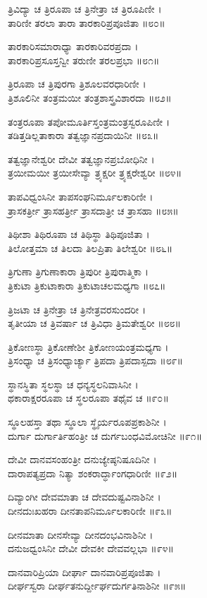 ತ್ರಿವಿದ್ಯಾ ಚ ತ್ರಿರೂಪಾ ಚ ತ್ರಿನೇತ್ರಾ ಚ ತ್ರಿರೂಪಿಣೀ ।\\
ತಾರಿಣೀ ತರಲಾ ತಾರಾ ತಾರಕಾರಿಪ್ರಪೂಜಿತಾ ॥೮೦॥

ತಾರಕಾರಿಸಮಾರಾಧ್ಯಾ ತಾರಕಾರಿವರಪ್ರದಾ ।\\
ತಾರಕಾರಿಪ್ರಸೂಸ್ತನ್ವೀ ತರುಣೀ ತರಲಪ್ರಭಾ ॥೮೧॥

ತ್ರಿರೂಪಾ ಚ ತ್ರಿಪುರಗಾ ತ್ರಿಶೂಲವರಧಾರಿಣೀ ।\\
ತ್ರಿಶೂಲಿನೀ ತಂತ್ರಮಯೀ ತಂತ್ರಶಾಸ್ತ್ರವಿಶಾರದಾ ॥೮೨॥

ತಂತ್ರರೂಪಾ ತಪೋಮೂರ್ತಿಸ್ತಂತ್ರಮಂತ್ರಸ್ವರೂಪಿಣೀ ।\\
ತಡಿತ್ತಡಿಲ್ಲತಾಕಾರಾ ತತ್ವಜ್ಞಾನಪ್ರದಾಯಿನೀ ॥೮೩॥

ತತ್ವಜ್ಞಾನೇಶ್ವರೀ ದೇವೀ ತತ್ವಜ್ಞಾನಪ್ರಬೋಧಿನೀ ।\\
ತ್ರಯೀಮಯೀ ತ್ರಯೀಸೇವ್ಯಾ ತ್ರ್ಯಕ್ಷರೀ ತ್ರ್ಯಕ್ಷರೇಶ್ವರೀ ॥೮೪॥

ತಾಪವಿಧ್ವಂಸಿನೀ ತಾಪಸಂಘನಿರ್ಮೂಲಕಾರಿಣೀ ।\\
ತ್ರಾಸಕರ್ತ್ರೀ ತ್ರಾಸಹರ್ತ್ರೀ ತ್ರಾಸದಾತ್ರೀ ಚ ತ್ರಾಸಹಾ ॥೮೫॥

ತಿಥೀಶಾ ತಿಥಿರೂಪಾ ಚ ತಿಥಿಸ್ಥಾ ತಿಥಿಪೂಜಿತಾ ।\\
ತಿಲೋತ್ತಮಾ ಚ ತಿಲದಾ ತಿಲಪ್ರಿತಾ ತಿಲೇಶ್ವರೀ ॥೮೬॥

ತ್ರಿಗುಣಾ ತ್ರಿಗುಣಾಕಾರಾ ತ್ರಿಪುರೀ ತ್ರಿಪುರಾತ್ಮಿಕಾ ।\\
ತ್ರಿಕುಟಾ ತ್ರಿಕುಟಾಕಾರಾ ತ್ರಿಕುಟಾಚಲಮಧ್ಯಗಾ ॥೮೭॥

ತ್ರಿಜಟಾ ಚ ತ್ರಿನೇತ್ರಾ ಚ ತ್ರಿನೇತ್ರವರಸುಂದರೀ ।\\
ತೃತೀಯಾ ಚ ತ್ರಿವರ್ಷಾ ಚ ತ್ರಿವಿಧಾ ತ್ರಿಮತೇಶ್ವರೀ ॥೮೮॥

ತ್ರಿಕೋಣಸ್ಥಾ ತ್ರಿಕೋಣೇಶೀ ತ್ರಿಕೋಣಯಂತ್ರಮಧ್ಯಗಾ ।\\
ತ್ರಿಸಂಧ್ಯಾ ಚ ತ್ರಿಸಂಧ್ಯಾರ್ಚ್ಯಾ ತ್ರಿಪದಾ ತ್ರಿಪದಾಸ್ಪದಾ ॥೮೯॥

ಸ್ಥಾನಸ್ಥಿತಾ ಸ್ಥಲಸ್ಥಾ ಚ ಧನ್ಯಸ್ಥಲನಿವಾಸಿನೀ ।\\
ಥಕಾರಾಕ್ಷರರೂಪಾ ಚ ಸ್ಥಲರೂಪಾ ತಥೈವ ಚ ॥೯೦॥

ಸ್ಥೂಲಹಸ್ತಾ ತಥಾ ಸ್ಥೂಲಾ ಸ್ಥೈರ್ಯರೂಪಪ್ರಕಾಶಿನೀ ।\\
ದುರ್ಗಾ ದುರ್ಗಾರ್ತಿಹಂತ್ರೀ ಚ ದುರ್ಗಬಂಧವಿಮೋಚಿನೀ ॥೯೧॥

ದೇವೀ ದಾನವಸಂಹಂತ್ರೀ ದನುಜ್ಯೇಷ್ಠನಿಷೂದಿನೀ ।\\
ದಾರಾಪತ್ಯಪ್ರದಾ ನಿತ್ಯಾ ಶಂಕರಾರ್ದ್ಧಾಂಗಧಾರಿಣೀ ॥೯೨॥

ದಿವ್ಯಾಂಗೀ ದೇವಮಾತಾ ಚ ದೇವದುಷ್ಟವಿನಾಶಿನೀ ।\\
ದೀನದುಃಖಹರಾ ದೀನತಾಪನಿರ್ಮೂಲಕಾರಿಣೀ ॥೯೩॥

ದೀನಮಾತಾ ದೀನಸೇವ್ಯಾ ದೀನದಂಭವಿನಾಶಿನೀ ।\\
ದನುಜಧ್ವಂಸಿನೀ ದೇವೀ ದೇವಕೀ ದೇವವಲ್ಲಭಾ ॥೯೪॥

ದಾನವಾರಿಪ್ರಿಯಾ ದೀರ್ಘಾ ದಾನವಾರಿಪ್ರಪೂಜಿತಾ ।\\
ದೀರ್ಘಸ್ವರಾ ದೀರ್ಘತನುರ್ದ್ದೀರ್ಘದುರ್ಗತಿನಾಶಿನೀ ॥೯೫॥

